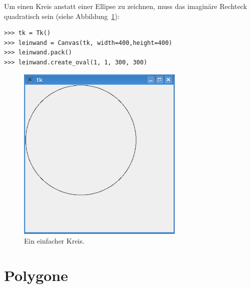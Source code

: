 \noindent
Um einen Kreis anstatt einer Ellipse zu zeichnen, muss das imaginäre Rechteck quadratisch sein (siehe Abbildung~\ref{fig40}):

\begin{Verbatim}[frame=single]
>>> tk = Tk()
>>> leinwand = Canvas(tk, width=400,height=400)
>>> leinwand.pack()
>>> leinwand.create_oval(1, 1, 300, 300)
\end{Verbatim}

\begin{figure}
\begin{center}
\includegraphics[width=80mm]{images/figure40}
\end{center}
\caption{Ein einfacher Kreis.}\label{fig40}
\end{figure}

\section{Polygone}

